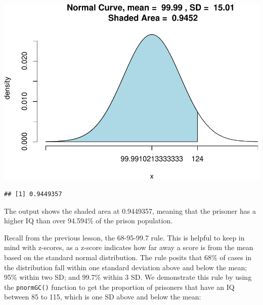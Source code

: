 \documentclass[
]{book}
\newenvironment{Shaded}{\begin{snugshade}}{\end{snugshade}}
\newcommand{\AttributeTok}[1]{\textcolor[rgb]{0.77,0.63,0.00}{#1}}
\newcommand{\CommentTok}[1]{\textcolor[rgb]{0.56,0.35,0.01}{\textit{#1}}}
\newcommand{\ConstantTok}[1]{\textcolor[rgb]{0.00,0.00,0.00}{#1}}
\newcommand{\DecValTok}[1]{\textcolor[rgb]{0.00,0.00,0.81}{#1}}
\newcommand{\FunctionTok}[1]{\textcolor[rgb]{0.00,0.00,0.00}{#1}}
\newcommand{\NormalTok}[1]{#1}
\newcommand{\OtherTok}[1]{\textcolor[rgb]{0.56,0.35,0.01}{#1}}
\newcommand{\SpecialCharTok}[1]{\textcolor[rgb]{0.00,0.00,0.00}{#1}}
\newcommand{\StringTok}[1]{\textcolor[rgb]{0.31,0.60,0.02}{#1}}
\begin{document}
\begin{Shaded}
\end{Shaded}

\includegraphics{06-hypotheses_files/figure-latex/unnamed-chunk-24-1.pdf}

\begin{verbatim}
## [1] 0.9449357
\end{verbatim}

The output shows the shaded area at 0.9449357, meaning that the prisoner has a higher IQ than over 94.594\% of the prison population.

Recall from the previous lesson, the 68-95-99.7 rule. This is helpful to keep in mind with z-scores, as a z-score indicates how far away a score is from the mean based on the standard normal distribution. The rule posits that 68\% of cases in the distribution fall within one standard deviation above and below the mean; 95\% within two SD; and 99.7\% within 3 SD. We demonstrate this rule by using the \texttt{pnormGC()} function to get the proportion of prisoners that have an IQ between 85 to 115, which is one SD above and below the mean:
\end{document}
